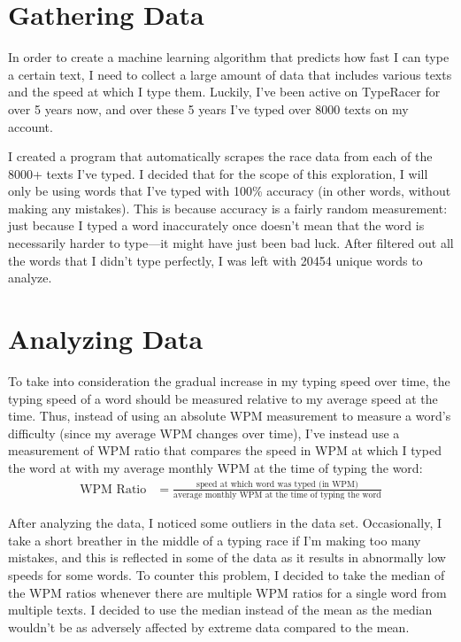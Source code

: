 \documentclass[12pt]{article}
\begin{document}
\section*{Gathering Data}

In order to create a machine learning algorithm that predicts how fast I can type a certain text, I need to collect a large amount of data that includes various texts and the speed at which I type them. Luckily, I've been active on TypeRacer for over 5 years now, and over these 5 years I've typed over 8000 texts on my account.

I created a program that automatically scrapes the race data from each of the 8000+ texts I've typed. I decided that for the scope of this exploration, I will only be using words that I've typed with 100\% accuracy (in other words, without making any mistakes). This is because accuracy is a fairly random measurement: just because I typed a word inaccurately once doesn't mean that the word is necessarily harder to type—it might have just been bad luck. After filtered out all the words that I didn't type perfectly, I was left with 20454 unique words to analyze.

\section*{Analyzing Data}

To take into consideration the gradual increase in my typing speed over time, the typing speed of a word should be measured relative to my average speed at the time. Thus, instead of using an absolute WPM measurement to measure a word's difficulty (since my average WPM changes over time), I've instead use a measurement of WPM ratio that compares the speed in WPM at which I typed the word at with my average monthly WPM at the time of typing the word:
\begin{align*}
	\text{WPM Ratio} & = \frac{\text{speed at which word was typed (in WPM)}}{\text{average monthly WPM at the time of typing the word}}
\end{align*}

After analyzing the data, I noticed some outliers in the data set. Occasionally, I take a short breather in the middle of a typing race if I'm making too many mistakes, and this is reflected in some of the data as it results in abnormally low speeds for some words. To counter this problem, I decided to take the median of the WPM ratios whenever there are multiple WPM ratios for a single word from multiple texts. I decided to use the median instead of the mean as the median wouldn't be as adversely affected by extreme data compared to the mean.
\end{document}

